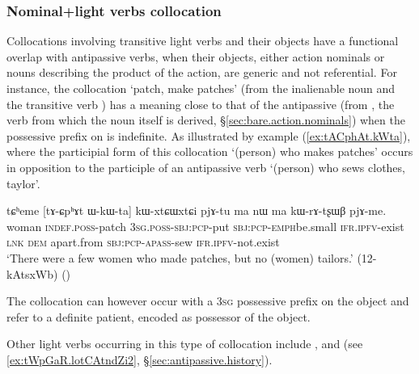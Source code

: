\subsubsection{Nominal+light verbs collocation  } \label{sec:antipassive.vs.light.verbs}
Collocations involving transitive light verbs and their objects have a functional overlap with antipassive verbs, when their objects, either action nominals or nouns describing the product of the action, are generic and not referential. For instance, the collocation  `patch, make patches' (from the inalienable noun  and the transitive verb ) has a meaning close to that of the antipassive  (from , the verb from which the noun  itself is derived, §\ref{sec:bare.action.nominals}) when the possessive prefix on   is indefinite. As illustrated by example (\ref{ex:tACphAt.kWta}), where the participial form of this collocation  `(person) who makes patches' occurs in opposition to the participle of an antipassive verb  `(person) who sews clothes, taylor'.  

\begin{exe}
\ex \label{ex:tACphAt.kWta}
\gll tɕʰeme [tɤ-ɕpʰɤt ɯ-kɯ-ta] kɯ-xtɕɯ\redp{}xtɕi pjɤ-tu ma nɯ ma kɯ-rɤ-tʂɯβ pjɤ-me. \\
woman \textsc{indef}.\textsc{poss}-patch \textsc{3sg}.\textsc{poss}-\textsc{sbj}:\textsc{pcp}-put  \textsc{sbj}:\textsc{pcp}-\textsc{emph}\redp{}be.small \textsc{ifr}.\textsc{ipfv}-exist \textsc{lnk} \textsc{dem} apart.from \textsc{sbj}:\textsc{pcp}-\textsc{apass}-sew \textsc{ifr}.\textsc{ipfv}-not.exist \\
\glt `There were a few women who made patches, but no (women) tailors.' (12-kAtsxWb) 	()
 \end{exe}
 
 The collocation  can however occur with a \textsc{3sg} possessive prefix on the object  and refer to a definite patient, encoded as possessor of the object. 
 
 Other light verbs occurring in this type of collocation include ,  and  (see \ref{ex:tWpGaR.lotCAtndZi2}, §\ref{sec:antipassive.history}).
 
